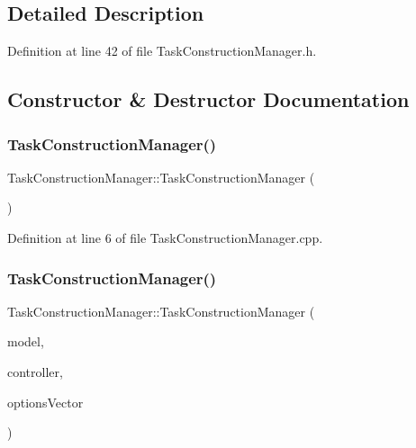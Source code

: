 \subsection{Detailed Description}


Definition at line 42 of file Task\+Construction\+Manager.\+h.



\subsection{Constructor \& Destructor Documentation}
\hypertarget{classocra_1_1TaskConstructionManager_aaca5f4d8ed3ee26c1d26dcee88532428}{}\label{classocra_1_1TaskConstructionManager_aaca5f4d8ed3ee26c1d26dcee88532428} 
\subsubsection{\texorpdfstring{Task\+Construction\+Manager()}{TaskConstructionManager()}\hspace{0.1cm}{\footnotesize\ttfamily [1/3]}}
{\footnotesize\ttfamily Task\+Construction\+Manager\+::\+Task\+Construction\+Manager (\begin{DoxyParamCaption}{ }\end{DoxyParamCaption})}



Definition at line 6 of file Task\+Construction\+Manager.\+cpp.

\hypertarget{classocra_1_1TaskConstructionManager_a290841cfd953f5162913f849e9b5eeaf}{}\label{classocra_1_1TaskConstructionManager_a290841cfd953f5162913f849e9b5eeaf} 
\subsubsection{\texorpdfstring{Task\+Construction\+Manager()}{TaskConstructionManager()}\hspace{0.1cm}{\footnotesize\ttfamily [2/3]}}
{\footnotesize\ttfamily Task\+Construction\+Manager\+::\+Task\+Construction\+Manager (\begin{DoxyParamCaption}\item[{Model\+::\+Ptr}]{model,  }\item[{Controller\+::\+Ptr}]{controller,  }\item[{std\+::vector$<$ \hyperlink{classocra_1_1TaskBuilderOptions}{Task\+Builder\+Options} $>$}]{options\+Vector }\end{DoxyParamCaption})}




